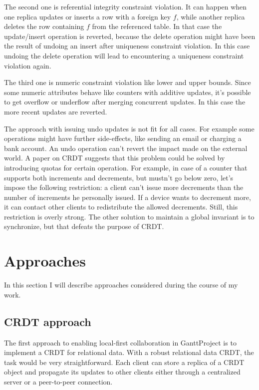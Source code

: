 \documentclass[a4paper, 11pt, oneside]{article}
\theoremstyle{definition}
\begin{document}
The second one is referential integrity constraint violation. It can happen when one replica updates or inserts a row with a foreign key $f$, while another replica deletes the row containing $f$ from the referenced table. In that case the update/insert operation is reverted, because the delete operation might have been the result of undoing an insert after uniqueness constraint violation. In this case undoing the delete operation will lead to encountering a uniqueness constraint violation again.

The third one is numeric constraint violation like lower and upper bounds. Since some numeric attributes behave like counters with additive updates, it's possible to get overflow or underflow after merging concurrent updates. In this case the more recent updates are reverted.

The approach with issuing undo updates is not fit for all cases. For example some operations might have further side-effects, like sending an email or charging a bank account.  An undo operation can't revert the impact made on the external world. A paper on CRDT \cite{crdt} suggests that this problem could be solved by introducing quotas for certain operation. For example, in case of a counter that supports both increments and decrements, but mustn't go below zero, let's impose the following restriction: a client can't issue more decrements than the number of increments he personally issued. If a device wants to decrement more, it can contact other clients to redistribute the allowed decrements. Still, this restriction is overly strong. The other solution to maintain a global invariant is to synchronize, but that defeats the purpose of CRDT.

\section{Approaches}
In this section I will describe approaches considered during the course of my work.

\subsection{CRDT approach}
The first approach to enabling local-first collaboration in GanttProject is to implement a CRDT for relational data. With a robust relational data CRDT, the task would be very straightforward. Each client can store a replica of a CRDT object and propagate its updates to other clients either through a centralized server or a peer-to-peer connection.
\end{document}
